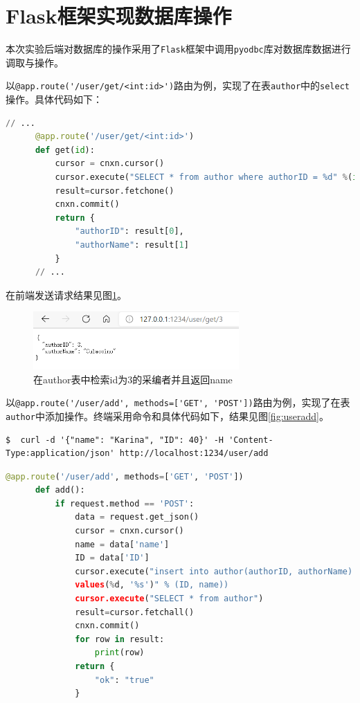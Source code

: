 \documentclass[11pt]{article}
\begin{document}
  \section{Flask框架实现数据库操作}

  本次实验后端对数据库的操作采用了\verb|Flask|框架中调用\verb|pyodbc|库对数据库数据进行调取与操作。

  以\lstinline|@app.route('/user/get/<int:id>')|路由为例，实现了在表\verb|author|中的\verb|select|操作。具体代码如下：

  \begin{file}[app.py]
    \begin{lstlisting}[language=Python]
      // ...
      @app.route('/user/get/<int:id>')
      def get(id):
          cursor = cnxn.cursor()
          cursor.execute("SELECT * from author where authorID = %d" %(id))
          result=cursor.fetchone() 
          cnxn.commit() 
          return {
              "authorID": result[0],
              "authorName": result[1]
          }
      // ...
    \end{lstlisting}
  \end{file}

  在前端发送请求结果见图\ref{fig:userget}。
  \begin{figure}[h]
    \centering
    \includegraphics[width=0.7\textwidth]{userget.png}
    \caption{在author表中检索id为3的采编者并且返回name}
    \label{fig:userget}
  \end{figure}

  以\lstinline|@app.route('/user/add', methods=['GET', 'POST'])|路由为例，实现了在表\verb|author|中添加操作。终端采用命令和具体代码如下，结果见图\ref{fig:useradd}。

  \begin{commandline}
    \begin{verbatim}
$  curl -d '{"name": "Karina", "ID": 40}' -H 'Content-Type:application/json' http://localhost:1234/user/add
    \end{verbatim}
  \end{commandline}

  \begin{file}[app.py]
    \begin{lstlisting}[language=Python]
      @app.route('/user/add', methods=['GET', 'POST'])
      def add():
          if request.method == 'POST':
              data = request.get_json()
              cursor = cnxn.cursor()
              name = data['name']
              ID = data['ID']
              cursor.execute("insert into author(authorID, authorName) 
              values(%d, '%s')" % (ID, name))
              cursor.execute("SELECT * from author")
              result=cursor.fetchall()
              cnxn.commit()
              for row in result:
                  print(row)
              return {
                  "ok": "true"
              }
    \end{lstlisting}
  \end{file}
\end{document}
